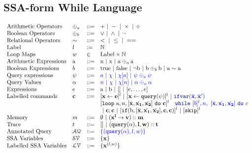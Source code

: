 \documentclass[a4paper,11pt]{article}
\begin{document}
\subsection{SSA-form While Language}
\[
\begin{array}{llll}
 \mbox{Arithmetic Operators} & \oplus_a & ::= & + ~|~ - ~|~ \times 
%
~|~ \div \\  
  \mbox{Boolean Operators} & \oplus_b & ::= & \lor ~|~ \land ~|~ \neg\\
   \mbox{Relational Operators} & \sim & ::= & < ~|~ \leq ~|~ == \\  
 \mbox{Label} & l & := & \mathbb{N} \\ 
 \mbox{Loop Maps} & w & \in & \mbox{Label} \times \mathbb{N} \\
\mbox{Arithmetic Expressions} & \saexpr & ::= & 
	\textrm{n} ~|~ \textrm{x} ~|~ \saexpr \oplus_a \saexpr  \\
\mbox{Boolean Expressions} & \bexpr & ::= & 
	\textrm{true} ~|~ \textrm{false}  ~|~ \neg \sbexpr
	 ~|~ \sbexpr \oplus_b \sbexpr
	~|~ \saexpr \sim \saexpr 
	\\
\mbox{Query expressions} & \qexpr & ::= 
& \jl{ \aexpr ~|~ \chi ~|~ \chi[\aexpr] ~|~ \qexpr \oplus_a \qexpr} 
\\
\mbox{Query Values} & \qval & ::= 
& \jl{ n ~|~ \chi ~|~ \chi[n] ~|~ \qval \oplus_a  \qval }
\\
\mbox{Expressions} & \sexpr & ::= & \saexpr \sep \sbexpr ~|~ [] ~|~ [\expr, \dots, \expr]
\\	
\mbox{Labelled commands} & \ssa{c} & ::= &   [\assign {\ssa{x}}{ \ssa{\expr}}]^{l} ~|~  [\assign {\ssa{x} } {\ssa{\query(\qexpr)}}]^{l}
%
~|~  {\jl{\eifvar(\bar{\ssa{x}}, \bar{\ssa{x}}')}} \\ 
&&& 
[\eloop ~ \saexpr, n, [\bar{\ssa{x}}, \bar{\ssa{x_1}}, \bar{\ssa{x_2}}] ~ \edo ~ \ssa{c} ]^{l} 
~~~
\jl{\ewhile ~ [ b ]^{l} , n,
~ 
[\bar{\ssa{x}}, \bar{\ssa{x_1}}, \bar{\ssa{x_2}}] 
~ \edo ~  c }
\\
&&&
~|~ \ssa{c};\ssa{c}  
~|~ [\eif(\sbexpr, [\bar{\ssa{x}}, \bar{\ssa{x_1}}, \bar{\ssa{x_2}}] , \ssa{c}, \ssa{c})]^l 
~|~ [\eskip]^{l} \\
\mbox{Memory} & m & ::= & \emptyset ~|~ \ssa{ ({x^{l}} \to v) :: m } \\
%
\mbox{Trace} & t & ::= & [] ~|~ \ssa{{(\query(\qval), l , w ) :: t}} \\
\mbox{Annotated Query} & \mathcal{AQ}  & 
::= & \jl{\{ (\query(\qval), l , w )  \} }
 \\
\mbox{SSA Variables} & \mathcal{SV}  & ::= & \{ \ssa{x} \} \\
\mbox{Labelled SSA Variables} & \mathcal{LV}  & ::= & \{ \ssa{x}^{(l,w)}  \}
\end{array}
\]
%
\end{document}
